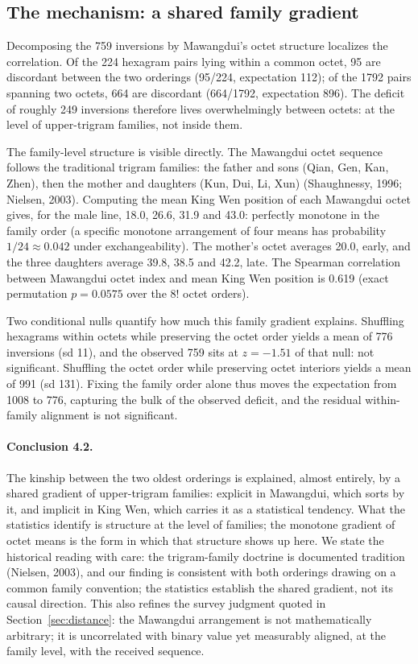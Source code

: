 \documentclass[11pt]{article}
\begin{document}
\subsection{The mechanism: a shared family gradient}

Decomposing the 759 inversions by Mawangdui's octet structure localizes the correlation. Of the 224 hexagram pairs lying within a common octet, 95 are discordant between the two orderings (95/224, expectation 112); of the 1792 pairs spanning two octets, 664 are discordant (664/1792, expectation 896). The deficit of roughly 249 inversions therefore lives overwhelmingly between octets: at the level of upper-trigram families, not inside them.

The family-level structure is visible directly. The Mawangdui octet sequence follows the traditional trigram families: the father and sons (Qian, Gen, Kan, Zhen), then the mother and daughters (Kun, Dui, Li, Xun) (Shaughnessy, 1996; Nielsen, 2003). Computing the mean King Wen position of each Mawangdui octet gives, for the male line, 18.0, 26.6, 31.9 and 43.0: perfectly monotone in the family order (a specific monotone arrangement of four means has probability $1/24 \approx 0.042$ under exchangeability). The mother's octet averages 20.0, early, and the three daughters average 39.8, 38.5 and 42.2, late. The Spearman correlation between Mawangdui octet index and mean King Wen position is 0.619 (exact permutation $p = 0.0575$ over the $8!$ octet orders).

Two conditional nulls quantify how much this family gradient explains. Shuffling hexagrams within octets while preserving the octet order yields a mean of 776 inversions (sd 11), and the observed 759 sits at $z = -1.51$ of that null: not significant. Shuffling the octet order while preserving octet interiors yields a mean of 991 (sd 131). Fixing the family order alone thus moves the expectation from 1008 to 776, capturing the bulk of the observed deficit, and the residual within-family alignment is not significant.

\paragraph{Conclusion 4.2.} The kinship between the two oldest orderings is explained, almost entirely, by a shared gradient of upper-trigram families: explicit in Mawangdui, which sorts by it, and implicit in King Wen, which carries it as a statistical tendency. What the statistics identify is structure at the level of families; the monotone gradient of octet means is the form in which that structure shows up here. We state the historical reading with care: the trigram-family doctrine is documented tradition (Nielsen, 2003), and our finding is consistent with both orderings drawing on a common family convention; the statistics establish the shared gradient, not its causal direction. This also refines the survey judgment quoted in Section~\ref{sec:distance}: the Mawangdui arrangement is not mathematically arbitrary; it is uncorrelated with binary value yet measurably aligned, at the family level, with the received sequence.
\end{document}
